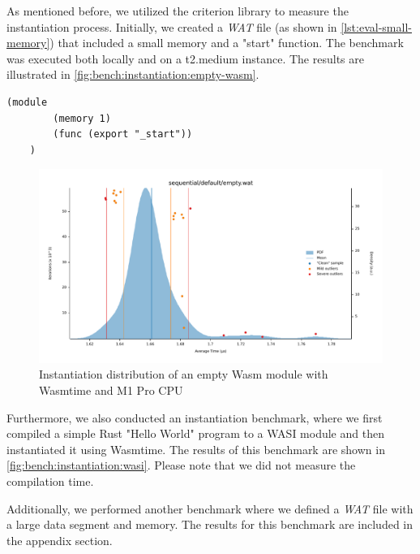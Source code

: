 As mentioned before, we utilized the criterion library to measure the instantiation process. Initially, we created a \textit{WAT} file (as shown in \autoref{lst:eval-small-memory}) that included a small memory and a "start" function. The benchmark was executed both locally and on a t2.medium instance. The results are illustrated in \autoref{fig:bench:instantiation:empty-wasm}.

\begin{lstlisting}[frame=lines, style=Wasm, caption={WASI module with small memory}, showstringspaces=false, captionpos=b, label={lst:eval-small-memory}]
    (module
        (memory 1)
        (func (export "_start"))
    )
\end{lstlisting}

\begin{figure}[htbp]
    \centering
        \includegraphics[width=1\linewidth]{images/benches/sequential_default_empty_wasm.pdf}
    \caption{Instantiation distribution of an empty Wasm module with Wasmtime and M1 Pro CPU}
    \label{fig:bench:instantiation:empty-wasm}
\end{figure}

Furthermore, we also conducted an instantiation benchmark, where we first compiled a simple Rust "Hello World" program to a WASI module and then instantiated it using Wasmtime. The results of this benchmark are shown in \autoref{fig:bench:instantiation:wasi}. Please note that we did not measure the compilation time.

Additionally, we performed another benchmark where we defined a \textit{WAT} file with a large data segment and memory. The results for this benchmark are included in the appendix section.

